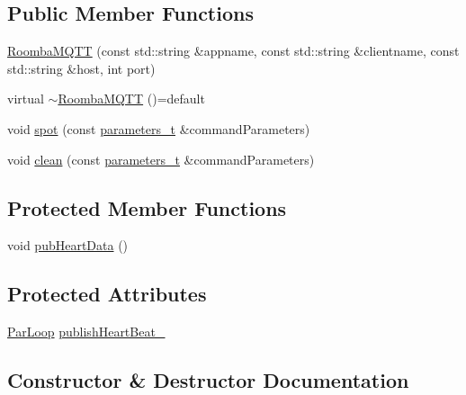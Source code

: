 \subsection*{Public Member Functions}
\begin{DoxyCompactItemize}
\item 
\hyperlink{class_roomba_m_q_t_t_a20d5a60deabb9b8148a3cf0f1409dc71}{Roomba\+M\+Q\+TT} (const std\+::string \&appname, const std\+::string \&clientname, const std\+::string \&host, int port)
\item 
virtual \hyperlink{class_roomba_m_q_t_t_a09e4ed694fcbf4e1f158d0f4eb49683d}{$\sim$\+Roomba\+M\+Q\+TT} ()=default
\item 
void \hyperlink{class_roomba_m_q_t_t_a6f3742feb79a0743c5a79402b9bc9c1f}{spot} (const \hyperlink{_roomba_m_q_t_t_8h_ad3b3bd6544a775cf1e31cd71610c5765}{parameters\+\_\+t} \&command\+Parameters)
\item 
void \hyperlink{class_roomba_m_q_t_t_ae1db76fddfb7c1394bfaed552de1b21d}{clean} (const \hyperlink{_roomba_m_q_t_t_8h_ad3b3bd6544a775cf1e31cd71610c5765}{parameters\+\_\+t} \&command\+Parameters)
\end{DoxyCompactItemize}
\subsection*{Protected Member Functions}
\begin{DoxyCompactItemize}
\item 
void \hyperlink{class_roomba_m_q_t_t_af039bf156519a272d7770831894d0ac8}{pub\+Heart\+Data} ()
\end{DoxyCompactItemize}
\subsection*{Protected Attributes}
\begin{DoxyCompactItemize}
\item 
\hyperlink{class_par_loop}{Par\+Loop} \hyperlink{class_roomba_m_q_t_t_a87013e349743a9ebd7f403adf5a23703}{publish\+Heart\+Beat\+\_\+}
\end{DoxyCompactItemize}


\subsection{Constructor \& Destructor Documentation}
